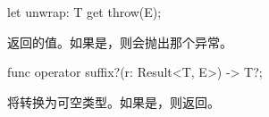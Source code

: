 \begin{itemdecl}
let unwrap: T { get throw(E); }
\end{itemdecl}

\pnum
{}返回的值。如果是，则会抛出那个异常。

\begin{itemdecl}
func operator suffix?(r: Result<T, E>) -> T?;
\end{itemdecl}

\pnum
{}将转换为可空类型。如果是，则返回。
